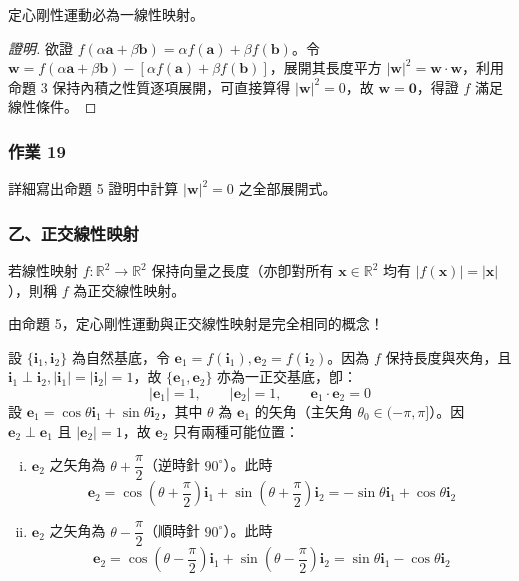 \begin{proposition}[命題 5]
定心剛性運動必為一線性映射。
\end{proposition}

\begin{proof}[證明]
欲證 $f(\alpha\mathbf{a} + \beta\mathbf{b}) = \alpha f(\mathbf{a}) + \beta f(\mathbf{b})$。令 $\mathbf{w} = f(\alpha\mathbf{a} + \beta\mathbf{b}) - [\alpha f(\mathbf{a}) + \beta f(\mathbf{b})]$，展開其長度平方 $|\mathbf{w}|^2 = \mathbf{w} \cdot \mathbf{w}$，利用命題 3 保持內積之性質逐項展開，可直接算得 $|\mathbf{w}|^2 = 0$，故 $\mathbf{w} = \mathbf{0}$，得證 $f$ 滿足線性條件。
\end{proof}

\subsubsection*{作業 19}
詳細寫出命題 5 證明中計算 $|\mathbf{w}|^2 = 0$ 之全部展開式。

\subsubsection*{乙、正交線性映射}

\begin{definition}[定義]
若線性映射 $f: \mathbb{R}^2 \to \mathbb{R}^2$ 保持向量之長度（亦卽對所有 $\mathbf{x} \in \mathbb{R}^2$ 均有 $|f(\mathbf{x})| = |\mathbf{x}|$），則稱 $f$ 為正交線性映射。
\end{definition}

由命題 5，定心剛性運動與正交線性映射是完全相同的概念！

設 $\{\mathbf{i}_1, \mathbf{i}_2\}$ 為自然基底，令 $\mathbf{e}_1 = f(\mathbf{i}_1), \mathbf{e}_2 = f(\mathbf{i}_2)$。因為 $f$ 保持長度與夾角，且 $\mathbf{i}_1 \perp \mathbf{i}_2, |\mathbf{i}_1| = |\mathbf{i}_2| = 1$，故 $\{\mathbf{e}_1, \mathbf{e}_2\}$ 亦為一正交基底，卽：
\[ |\mathbf{e}_1| = 1, \qquad |\mathbf{e}_2| = 1, \qquad \mathbf{e}_1 \cdot \mathbf{e}_2 = 0 \]
設 $\mathbf{e}_1 = \cos\theta \mathbf{i}_1 + \sin\theta \mathbf{i}_2$，其中 $\theta$ 為 $\mathbf{e}_1$ 的矢角（主矢角 $\theta_0 \in (-\pi, \pi]$）。因 $\mathbf{e}_2 \perp \mathbf{e}_1$ 且 $|\mathbf{e}_2| = 1$，故 $\mathbf{e}_2$ 只有兩種可能位置：
\begin{enumerate}[(i)]
  \item $\mathbf{e}_2$ 之矢角為 $\theta + \dfrac{\pi}{2}$（逆時針 $90^\circ$）。此時
  \[ \mathbf{e}_2 = \cos\left(\theta + \frac{\pi}{2}\right)\mathbf{i}_1 + \sin\left(\theta + \frac{\pi}{2}\right)\mathbf{i}_2 = -\sin\theta\mathbf{i}_1 + \cos\theta\mathbf{i}_2 \]
  \item $\mathbf{e}_2$ 之矢角為 $\theta - \dfrac{\pi}{2}$（順時針 $90^\circ$）。此時
  \[ \mathbf{e}_2 = \cos\left(\theta - \frac{\pi}{2}\right)\mathbf{i}_1 + \sin\left(\theta - \frac{\pi}{2}\right)\mathbf{i}_2 = \sin\theta\mathbf{i}_1 - \cos\theta\mathbf{i}_2 \]
\end{enumerate}

